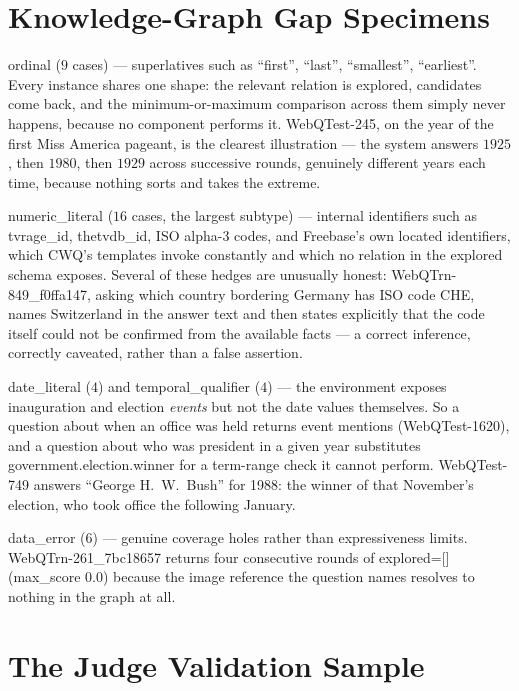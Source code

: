 \section{Knowledge-Graph Gap Specimens}\label{app:kg-gap-cases}

\textsf{ordinal} ($9$ cases) --- superlatives such as ``first'', ``last'',
``smallest'', ``earliest''. Every instance shares one shape: the relevant
relation is explored, candidates come back, and the minimum-or-maximum
comparison across them simply never happens, because no component performs it.
\textsf{WebQTest-245}, on the year of the first Miss America pageant, is the
clearest illustration --- the system answers $1925$, then $1980$, then $1929$
across successive rounds, genuinely different years each time, because nothing
sorts and takes the extreme.

\textsf{numeric\_literal} ($16$ cases, the largest subtype) --- internal
identifiers such as \textsf{tvrage\_id}, \textsf{thetvdb\_id}, ISO alpha-3
codes, and Freebase's own located identifiers, which CWQ's templates invoke
constantly and which no relation in the explored schema exposes. Several of
these hedges are unusually honest: \textsf{WebQTrn-849\_f0ffa147}, asking which
country bordering Germany has ISO code CHE, names Switzerland in the answer text
and then states explicitly that the code itself could not be confirmed from the
available facts --- a correct inference, correctly caveated, rather than a false
assertion.

\textsf{date\_literal} ($4$) and \textsf{temporal\_qualifier} ($4$) --- the
environment exposes inauguration and election \emph{events} but not the date
values themselves. So a question about when an office was held returns event
mentions (\textsf{WebQTest-1620}), and a question about who was president in a
given year substitutes \textsf{government.election.winner} for a term-range
check it cannot perform. \textsf{WebQTest-749} answers ``George H.~W.~Bush'' for
1988: the winner of that November's election, who took office the following
January.

\textsf{data\_error} ($6$) --- genuine coverage holes rather than expressiveness
limits. \textsf{WebQTrn-261\_7bc18657} returns four consecutive rounds of
\textsf{explored=[] (max\_score 0.0)} because the image reference the question
names resolves to nothing in the graph at all.


\section{The Judge Validation Sample}\label{app:judge-protocol}

